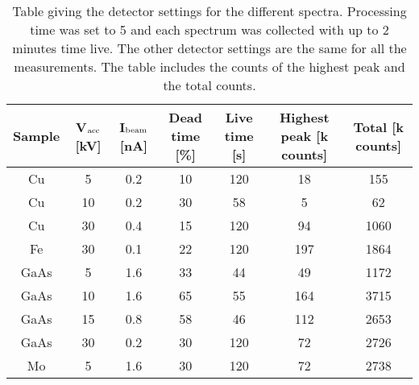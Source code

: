 \begin{table}[ht]
    \centering
    \caption{
        Table giving the detector settings for the different spectra.
        Processing time was set to 5 and each spectrum was collected with up to 2 minutes time live.
        The other detector settings are the same for all the measurements.
        The table includes the counts of the highest peak and the total counts.
    }
    \label{tab:method:detector:settings}
    \begin{tabular}{ccccccc}
        Sample & V$_\textnormal{acc}$ [kV] & I$_\textnormal{beam}$ [nA] & Dead time [\%] & Live time [s] & Highest peak [k counts] & Total [k counts] \\
        \hline
        Cu     & 5                         & 0.2                        & 10             & 120           & 18                      & 155              \\
        Cu     & 10                        & 0.2                        & 30             & 58            & 5                       & 62               \\
        Cu     & 30                        & 0.4                        & 15             & 120           & 94                      & 1060             \\
        Fe     & 30                        & 0.1                        & 22             & 120           & 197                     & 1864             \\
        GaAs   & 5                         & 1.6                        & 33             & 44            & 49                      & 1172             \\
        GaAs   & 10                        & 1.6                        & 65             & 55            & 164                     & 3715             \\
        GaAs   & 15                        & 0.8                        & 58             & 46            & 112                     & 2653             \\
        GaAs   & 30                        & 0.2                        & 30             & 120           & 72                      & 2726             \\
        Mo     & 5                         & 1.6                        & 30             & 120           & 72                      & 2738             \\

\end{tabular}
\end{table}

